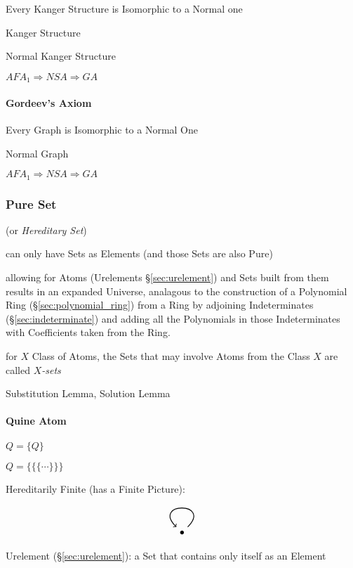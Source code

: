 Every Kanger Structure is Isomorphic to a Normal one

Kanger Structure

Normal Kanger Structure

$AFA_1 \Rightarrow NSA \Rightarrow GA$


\paragraph{Gordeev's Axiom}\label{sec:gordeevs_axiom}\hfill

Every Graph is Isomorphic to a Normal One

Normal Graph

$AFA_1 \Rightarrow NSA \Rightarrow GA$



\subsubsection{Pure Set}\label{sec:pure_set}

(or \emph{Hereditary Set})

can only have Sets as Elements (and those Sets are also Pure)
\cite{aczel88}

allowing for Atoms (Urelements \S\ref{sec:urelement}) and Sets built
from them results in an expanded Universe, analagous to the
construction of a Polynomial Ring (\S\ref{sec:polynomial_ring}) from a
Ring by adjoining Indeterminates (\S\ref{sec:indeterminate}) and
adding all the Polynomials in those Indeterminates with Coefficients
taken from the Ring.

for $X$ Class of Atoms, the Sets that may involve Atoms from the Class
$X$ are called \emph{$X$-sets}

Substitution Lemma, Solution Lemma



\paragraph{Quine Atom}\label{sec:quine_atom}\hfill

$Q = \{Q\}$

$Q = \{\{\{\cdots\}\}\}$

Hereditarily Finite (has a Finite Picture):
\[
  \begin{tikzpicture}
    \node (A) {$\bullet$};
    \draw[->,thick,loop] (A) to (A);
  \end{tikzpicture}
\]

Urelement (\S\ref{sec:urelement}): a Set that contains only itself as
an Element

